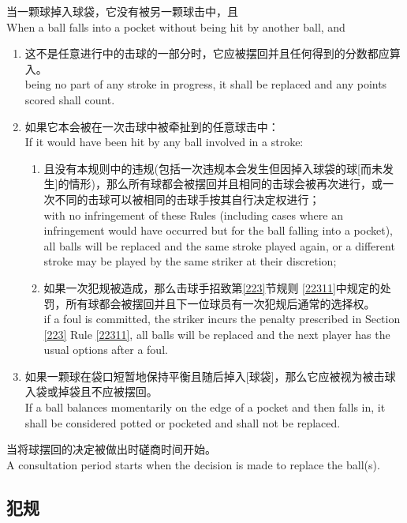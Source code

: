 \noindent 当一颗球掉入球袋，它没有被另一颗球击中，且\\
When a ball falls into a pocket without being hit by another ball, and
\begin{enumerate}[label=(\alph*)]
    \item 这不是任意进行中的击球的一部分时，它应被摆回并且任何得到的分数都应算入。\\
    being no part of any stroke in progress, it shall be replaced and any points scored shall count.
    \item 如果它本会被在一次击球中被牵扯到的任意球击中：\\
    If it would have been hit by any ball involved in a stroke:
    \begin{enumerate}[label=(\roman*)]
        \item 且没有本规则中的违规(包括一次违规本会发生但因掉入球袋的球[而未发生]的情形)，那么所有球都会被摆回并且相同的击球会被再次进行，或一次不同的击球可以被相同的击球手按其自行决定权进行；\\
        with no infringement of these Rules (including cases where an infringement would have occurred but for the ball falling into a pocket), all balls will be replaced and the same stroke played again, or a different stroke may be played by the same striker at their discretion;
        \item 如果一次犯规被造成，那么击球手招致第\ref{223}节规则 \ref{22311}中规定的处罚，所有球都会被摆回并且下一位球员有一次犯规后通常的选择权。\\
        if a foul is committed, the striker incurs the penalty prescribed in Section \ref{223} Rule \ref{22311}, all balls will be replaced and the next player has the usual options after a foul.
    \end{enumerate}
    \item 如果一颗球在袋口短暂地保持平衡且随后掉入[球袋]，那么它应被视为被击球入袋或掉袋且不应被摆回。\\
    If a ball balances momentarily on the edge of a pocket and then falls in, it shall be considered potted or pocketed and shall not be replaced.
\end{enumerate}
\noindent 当将球摆回的决定被做出时磋商时间开始。\\
A consultation period starts when the decision is made to replace the ball(s).

\subsection{犯规}\label{22310}

